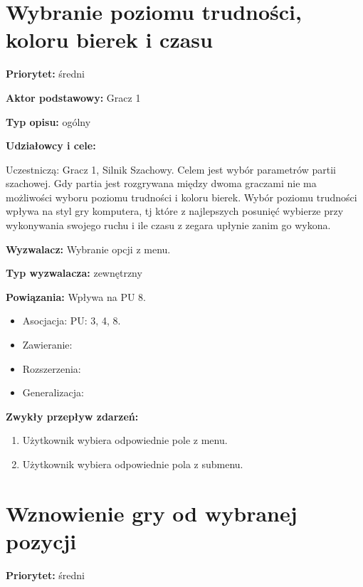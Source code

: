 \documentclass[12pt]{article}
\begin{document}




\section{Wybranie poziomu trudności, koloru bierek i czasu}

\textbf{Priorytet:} średni

\textbf{Aktor podstawowy:} Gracz 1

\textbf{Typ opisu:} ogólny

\textbf{Udziałowcy i cele:} 

Uczestniczą: Gracz 1, Silnik Szachowy. Celem jest wybór parametrów partii szachowej. Gdy partia jest rozgrywana między dwoma graczami nie ma możliwości wyboru poziomu trudności i koloru bierek. Wybór poziomu trudności wpływa na styl gry komputera, tj które z najlepszych posunięć wybierze przy wykonywania swojego ruchu i ile czasu z zegara upłynie zanim go wykona. 

\textbf{Wyzwalacz:} Wybranie opcji z menu.

\textbf{Typ wyzwalacza:} zewnętrzny

\textbf{Powiązania:} Wpływa na PU 8.
	\begin{itemize}\item Asocjacja: PU: 3, 4, 8.
	\item Zawieranie: 
	\item Rozszerzenia:
	\item Generalizacja: 
\end{itemize} 

\textbf{Zwykły przepływ zdarzeń:}  
\begin{enumerate}
\item Użytkownik wybiera odpowiednie pole z menu.
\item Użytkownik wybiera odpowiednie pola z submenu.
\end{enumerate} 





\section{Wznowienie gry od wybranej pozycji}

\textbf{Priorytet:} średni
\end{document}
